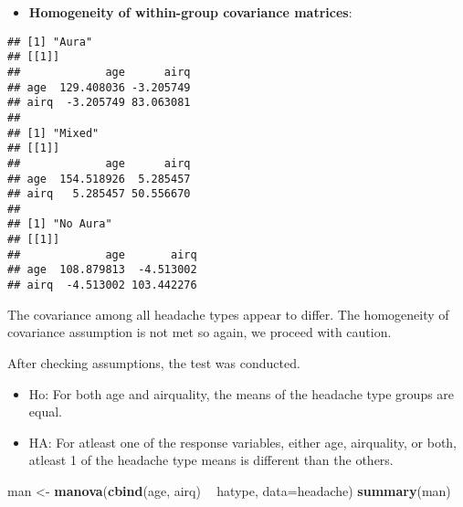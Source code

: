 \documentclass[]{article}
\newenvironment{Shaded}{\begin{snugshade}}{\end{snugshade}}
\newcommand{\ControlFlowTok}[1]{\textcolor[rgb]{0.13,0.29,0.53}{\textbf{#1}}}
\newcommand{\DataTypeTok}[1]{\textcolor[rgb]{0.13,0.29,0.53}{#1}}
\newcommand{\DecValTok}[1]{\textcolor[rgb]{0.00,0.00,0.81}{#1}}
\newcommand{\KeywordTok}[1]{\textcolor[rgb]{0.13,0.29,0.53}{\textbf{#1}}}
\newcommand{\NormalTok}[1]{#1}
\newcommand{\OperatorTok}[1]{\textcolor[rgb]{0.81,0.36,0.00}{\textbf{#1}}}
\newcommand{\StringTok}[1]{\textcolor[rgb]{0.31,0.60,0.02}{#1}}
\providecommand{\tightlist}{%
  \setlength{\itemsep}{0pt}\setlength{\parskip}{0pt}}
\begin{document}
\begin{itemize}
\tightlist
\item
  \textbf{Homogeneity of within-group covariance matrices}:
\end{itemize}

\begin{Shaded}
\end{Shaded}

\begin{verbatim}
## [1] "Aura"
## [[1]]
##             age      airq
## age  129.408036 -3.205749
## airq  -3.205749 83.063081
## 
## [1] "Mixed"
## [[1]]
##             age      airq
## age  154.518926  5.285457
## airq   5.285457 50.556670
## 
## [1] "No Aura"
## [[1]]
##             age       airq
## age  108.879813  -4.513002
## airq  -4.513002 103.442276
\end{verbatim}

The covariance among all headache types appear to differ. The
homogeneity of covariance assumption is not met so again, we proceed
with caution.

After checking assumptions, the test was conducted.

\begin{itemize}
\item
  Ho: For both age and airquality, the means of the headache type groups
  are equal.
\item
  HA: For atleast one of the response variables, either age, airquality,
  or both, atleast 1 of the headache type means is different than the
  others.
\end{itemize}

\begin{Shaded}
\begin{Highlighting}[]
\NormalTok{man <-}\StringTok{ }\KeywordTok{manova}\NormalTok{(}\KeywordTok{cbind}\NormalTok{(age, airq) }\OperatorTok{~}\StringTok{ }\NormalTok{hatype, }\DataTypeTok{data=}\NormalTok{headache)}
\KeywordTok{summary}\NormalTok{(man)}
\end{Highlighting}
\end{Shaded}
\end{document}
